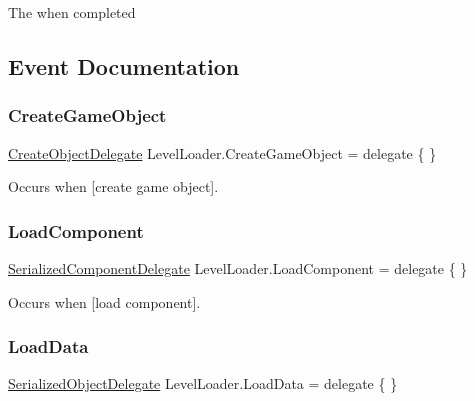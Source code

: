 The when completed 



\subsection{Event Documentation}
\mbox{\label{class_level_loader_a6467f227c2897f195d6c9f611d816cca}} 
\subsubsection{\texorpdfstring{Create\+Game\+Object}{CreateGameObject}}
{\footnotesize\ttfamily \hyperlink{class_level_loader_a251c136aac0e65fff5fef1c339fad356}{Create\+Object\+Delegate} Level\+Loader.\+Create\+Game\+Object = delegate \{ \}\hspace{0.3cm}{\ttfamily [static]}}



Occurs when \mbox{[}create game object\mbox{]}. 

\mbox{\label{class_level_loader_aeef57ebb788135e95410d8530a025403}} 
\subsubsection{\texorpdfstring{Load\+Component}{LoadComponent}}
{\footnotesize\ttfamily \hyperlink{class_level_loader_a233f68062303e5e0876c93646a9215ba}{Serialized\+Component\+Delegate} Level\+Loader.\+Load\+Component = delegate \{ \}\hspace{0.3cm}{\ttfamily [static]}}



Occurs when \mbox{[}load component\mbox{]}. 

\mbox{\label{class_level_loader_ae3f1e9846c9d625dfd2c522d35e5fa29}} 
\subsubsection{\texorpdfstring{Load\+Data}{LoadData}}
{\footnotesize\ttfamily \hyperlink{class_level_loader_a4483f031503dac772decbd9beedd784a}{Serialized\+Object\+Delegate} Level\+Loader.\+Load\+Data = delegate \{ \}\hspace{0.3cm}{\ttfamily [static]}}



